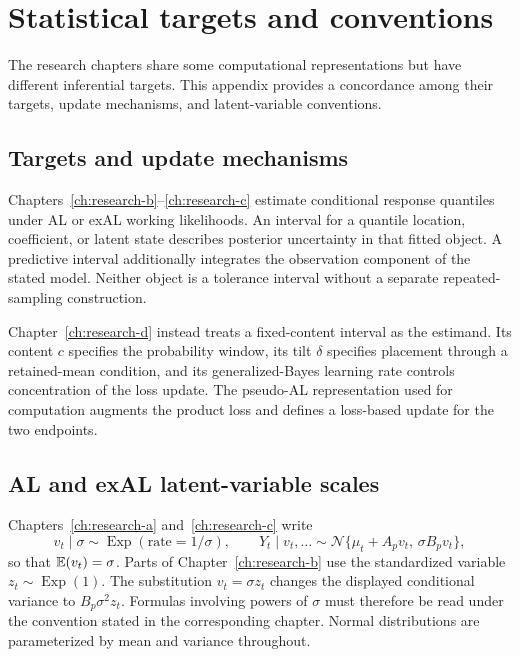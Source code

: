 \chapter{Statistical targets and conventions}
\label{app:shared-conventions}

The research chapters share some computational representations but have
different inferential targets. This appendix provides a concordance among
their targets, update mechanisms, and latent-variable conventions.

\section{Targets and update mechanisms}

Chapters~\ref{ch:research-b}--\ref{ch:research-c} estimate conditional
response quantiles under AL or exAL working likelihoods. An interval for a
quantile location, coefficient, or latent state describes posterior
uncertainty in that fitted object. A predictive interval additionally
integrates the observation component of the stated model. Neither object is
a tolerance interval without a separate repeated-sampling construction.

Chapter~\ref{ch:research-d} instead treats a fixed-content interval as the
estimand. Its content \(c\) specifies the probability window, its tilt
\(\delta\) specifies placement through a retained-mean condition, and its
generalized-Bayes learning rate controls concentration of the loss update.
The pseudo-AL representation used for computation augments the product loss
and defines a loss-based update for the two endpoints.

\section{AL and exAL latent-variable scales}

Chapters~\ref{ch:research-a} and~\ref{ch:research-c} write
\[
v_t\mid\sigma\sim\operatorname{Exp}(\text{rate}=1/\sigma),
\qquad
Y_t\mid v_t,\ldots\sim
\mathcal N\{\mu_t+A_pv_t,\,\sigma B_pv_t\},
\]
so that \(\mathbb{E}(v_t)=\sigma\). Parts of Chapter~\ref{ch:research-b} use the
standardized variable \(z_t\sim\operatorname{Exp}(1)\). The substitution
\(v_t=\sigma z_t\) changes the displayed conditional variance to
\(B_p\sigma^2z_t\). Formulas involving powers of \(\sigma\) must therefore
be read under the convention stated in the corresponding chapter. Normal
distributions are parameterized by mean and variance throughout.


